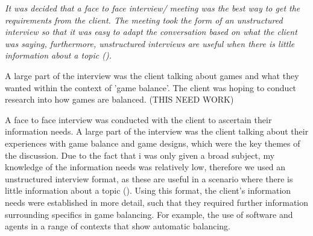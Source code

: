 \textit{It was decided that a face to face interview/ meeting was the best way to get the requirements from the client. The meeting took the form of an unstructured interview so that it was easy to adapt the conversation based on what the client was saying, furthermore, unstructured interviews are useful when there is little information about a topic (\cite{easwaramoorthy2006interviewing}). }

A large part of the interview was the client talking about games and what they wanted within the context of 'game balance'.  The client was hoping to conduct research into how games are balanced. (THIS NEED WORK)

A face to face interview was conducted with the client to ascertain their information needs. A large part of the interview was the client talking about their experiences with game balance and game designs, which were the key themes of the discussion. Due to the fact that i was only given a broad subject, my knowledge of the information needs was relatively low, therefore we used an unstructured interview format, as these are useful in a scenario where there is little information about a topic (\cite{easwaramoorthy2006interviewing}). Using this format, the client's information needs were established in more detail, such that they required further information surrounding specifics in game balancing. For example, the use of software and agents in a range of contexts that show automatic balancing.

